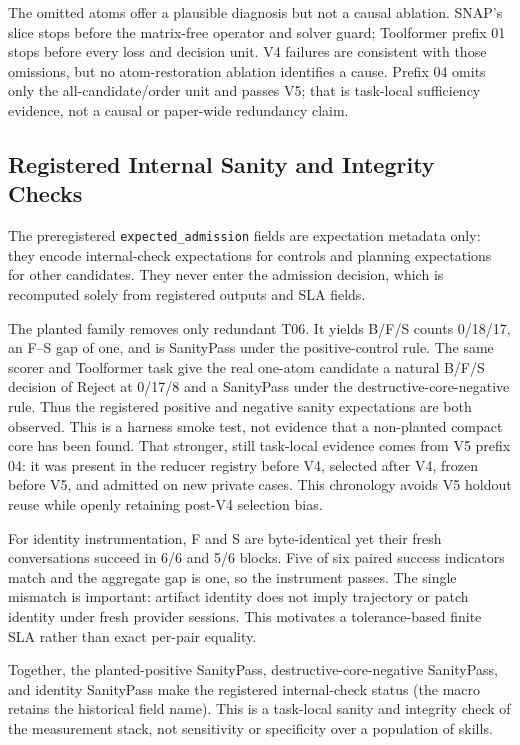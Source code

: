 \documentclass[letterpaper]{article} %
\begin{document}
The omitted atoms offer a plausible diagnosis but not a causal ablation.  SNAP's
slice stops before the matrix-free operator and solver guard; Toolformer prefix
01 stops before every loss and decision unit.  V4 failures are consistent with
those omissions, but no atom-restoration ablation identifies a cause.  Prefix 04
omits only the all-candidate/order unit and passes V5; that is task-local
sufficiency evidence, not a causal or paper-wide redundancy claim.

\subsection{Registered Internal Sanity and Integrity Checks}

The preregistered \texttt{expected\_admission} fields are expectation metadata
only: they encode internal-check expectations for controls and planning
expectations for other candidates.  They never enter the admission decision,
which is recomputed solely from registered outputs and SLA fields.

The planted family removes only redundant T06.  It yields B/F/S counts 0/18/17,
an F--S gap of one, and is SanityPass under the positive-control rule.  The same
scorer and Toolformer task give the real one-atom candidate a natural B/F/S
decision of Reject at 0/17/8 and a SanityPass under the destructive-core-negative
rule.  Thus the registered positive and negative sanity expectations are both
observed.  This is a harness smoke test, not evidence that
a non-planted compact core has been found.  That stronger, still task-local
evidence comes from V5 prefix 04: it was present in the reducer registry before
V4, selected after V4, frozen before V5, and admitted on new private cases.  This
chronology avoids V5 holdout reuse while openly retaining post-V4 selection bias.

For identity instrumentation, F and S are byte-identical yet their fresh
conversations succeed in 6/6 and 5/6 blocks.  Five of six paired success
indicators match and the aggregate gap is one, so the instrument passes.  The
single mismatch is important: artifact identity does not imply trajectory or
patch identity under fresh provider sessions.  This motivates a tolerance-based
finite SLA rather than exact per-pair equality.

Together, the planted-positive SanityPass, destructive-core-negative SanityPass,
and identity SanityPass make the registered internal-check status
\VFourCalibrationDecision{} (the macro retains the historical field name).  This
is a task-local sanity and integrity check of the measurement stack, not
sensitivity or specificity over a population of skills.
\end{document}
